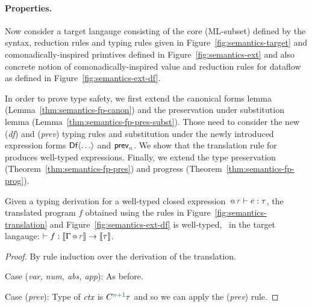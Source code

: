 \paragraph{Properties.}
Now consider a target langauge consisting of the core (ML-subset) defined by the syntax,
reduction rules and typing rules given in Figure~\ref{fig:semantics-target} and comonadically-inspired 
primtives defined in Figure~\ref{fig:semantics-ext} and also concrete notion of comonadically-inspired 
value and reduction rules for dataflow as defined in Figure~\ref{fig:semantics-ext-df}.

In order to prove type safety, we first extend the canonical forms lemma
(Lemma~\ref{thm:semantics-fp-canon}) and the preservation under substitution lemma
(Lemma~\ref{thm:semantics-fp-pres-subst}). Those need to consider the new (\emph{df}) 
and (\emph{prev}) typing rules and substitution under the newly introduced expression forms 
$\textnormal{\sffamily Df}\langle\ldots\rangle$ and $\ident{prev}_{\cclrd{n}}$. We show that the translation 
rule for  produces well-typed expressions. Finally, we extend the type preservation 
(Theorem~\ref{thm:semantics-fp-pres}) and progress (Theorem~\ref{thm:semantics-fp-prog}).

\begin{theorem}
\label{thm:semantics-df-welltyped}
Given a typing derivation for a well-typed closed expression $\coctx{}{\cclrd{r}} \vdash e : \tau$,
the translated program $f$ obtained using the rules in Figure~\ref{fig:semantics-translation}
and Figure~\ref{fig:semantics-ext-df} is well-typed, \ie~in the target langauge: $\vdash f : \sem{\coctx{\Gamma}{\cclrd{r}}} \rightarrow \sem{\tau}$.
\end{theorem}
\begin{proof}
By rule induction over the derivation of the translation. 

\vspace{0.5em}\noindent\hangindent=0.6cm 
Case (\emph{var, num, abs, app}): As before.

\vspace{0.5em}\noindent\hangindent=0.6cm 
Case (\emph{prev}): Type of $\textit{ctx}$ is $\ctyp{\cclrd{n+1}}\tau$ and so we can apply the (\emph{prev}) rule.
\end{proof}

